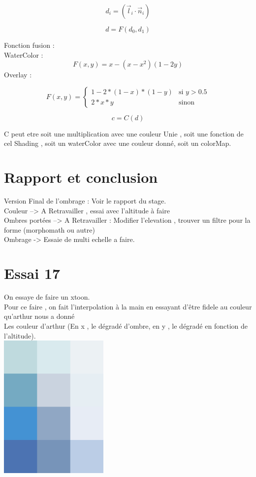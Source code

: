 \documentclass[a4paper]{article}
\begin{document}
\[d_i = (\vec{l}_i \cdot{\vec{n}_i}) \]


\[ d = F(d_0,d_1) \]


Fonction fusion : \\
WaterColor :
\[ F(x,y) = x - (x -x^2)( 1-2y) \]
Overlay : 

\[F(x,y) = 
	\left\{
    \begin{array}{ll}
        1-2*(1-x)*(1-y) & \mbox{si } y > 0.5 \\
		2*x*y & \mbox{sinon}				
    \end{array}
\right.
\]


\[ c = C(d)  \]

C peut etre soit une multiplication avec une couleur Unie , soit une fonction de cel Shading , soit un waterColor avec une couleur donné, soit un colorMap. 






 




\section{Rapport et conclusion}
Version Final de l'ombrage : Voir le rapport du stage. \\
Couleur --> A Retravailler , essai avec l'altitude à faire \\
Ombres portées --> A Retravailler : Modifier l'elevation , trouver un filtre pour la forme (morphomath ou autre)
\\
Ombrage -> Essaie de multi echelle a faire. \\


\section{Essai 17}

On essaye de faire un xtoon.\\
Pour ce faire , on fait l'interpolation à la main en essayant d'être fidele au couleur qu'arthur nous a donné \\ 
Les couleur d'arthur (En x , le dégradé d'ombre, en y , le dégradé en fonction de l'altitude).\\

\includegraphics[width=0.4\textwidth]{Images/couleur_officiel_Novat.png}
\end{document}
